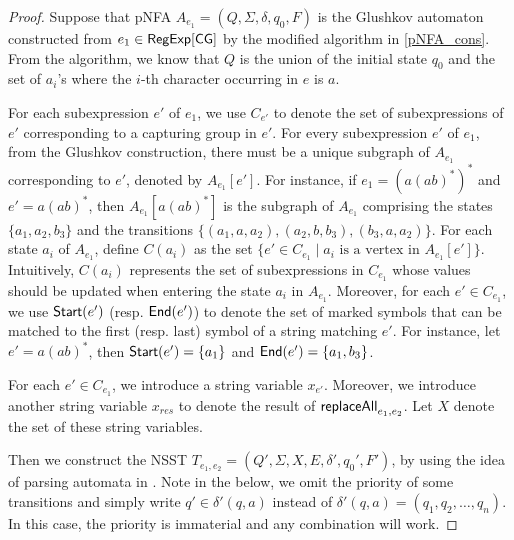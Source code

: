 \documentclass[sigplan,review,anonymous]{acmart}\settopmatter{printfolios=true,printccs=false,printacmref=false}
\newcommand\NSST{{\sf NSST}}
\newcommand\ssym{{\sf Start}}
\newcommand\esym{{\sf End}}
\begin{document}
\begin{proof}
Suppose that pNFA $A_{e_1} =(Q, \Sigma,  \delta, q_0, F)$ is the Glushkov automaton \cite{Gluskov61} constructed from $e_1 \in {\sf RegExp}[\sf CG]$ by the modified algorithm in \ref{pNFA_cons}. From the algorithm, we know that $Q$ is the union of the initial state $q_0$ and the set of $a_i$'s where the $i$-th character occurring in $e$ is $a$.

For each subexpression $e'$ of $e_1$, we use $C_{e'}$ to denote the set of subexpressions of $e'$ corresponding to a capturing group in $e'$.
For every subexpression $e'$ of $e_1$, from the Glushkov construction,
there must be a unique subgraph of $A_{e_1}$ corresponding to $e'$, denoted by $A_{e_1}[e']$. For instance, if $e_1 = (a (ab)^*)^*$ and $e' = a(ab)^*$, then $A_{e_1}[a(ab)^*]$ is the subgraph of $A_{e_1}$ comprising the states $\{a_1, a_2, b_3\}$ and the transitions $\{(a_1, a, a_2), (a_2, b, b_3), (b_3, a, a_2)\}$.
For each state $a_i$ of $A_{e_1}$, define $C(a_i)$  as the set $\{ e' \in C_{e_1} \mid a_i \mbox{ is a vertex in }
A_{e_1}[e']\}$. Intuitively, $C(a_i)$ represents the set of subexpressions in $C_{e_1}$ whose values should be updated when entering the state $a_i$ in $A_{e_1}$. Moreover, for each $e' \in C_{e_1}$, we use $\ssym(e')$ (resp. $\esym(e')$) to denote the set of marked symbols that can be matched to the first  (resp. last) symbol of a string matching $e'$. For instance, let $e' = a(ab)^*$, then $\ssym(e') = \{a_1\}$ and $\esym(e') = \{a_1, b_3\}$. 

For each $e' \in C_{e_1}$, we introduce a string variable $x_{e'}$. Moreover, we introduce another string variable $x_{res}$ to denote the result of $\mathsf{replaceAll}_{e_1,e_2}$. Let $X$ denote the set of these string variables.


Then we construct the \NSST{} $T_{e_1,e_2} = (Q', \Sigma, X, E, \delta', q_0', F')$, by using the idea of parsing automata in \cite{CCH+18}. Note in the below, we omit the priority of some transitions and simply write $q' \in \delta'(q,a)$ instead of $\delta'(q,a)=(q_1,q_2,\ldots,q_n)$. In this case, the priority is immaterial and any combination will work.


\end{proof}
\end{document}
